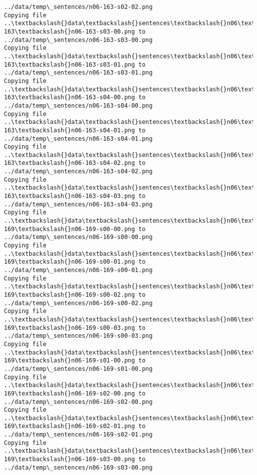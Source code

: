 \documentclass[11pt]{article}
\begin{document}
\begin{Verbatim}[commandchars=\\\{\}]
../data/temp\_sentences/n06-163-s02-02.png
Copying file ..\textbackslash{}data\textbackslash{}sentences\textbackslash{}n06\textbackslash{}n06-163\textbackslash{}n06-163-s03-00.png to
../data/temp\_sentences/n06-163-s03-00.png
Copying file ..\textbackslash{}data\textbackslash{}sentences\textbackslash{}n06\textbackslash{}n06-163\textbackslash{}n06-163-s03-01.png to
../data/temp\_sentences/n06-163-s03-01.png
Copying file ..\textbackslash{}data\textbackslash{}sentences\textbackslash{}n06\textbackslash{}n06-163\textbackslash{}n06-163-s04-00.png to
../data/temp\_sentences/n06-163-s04-00.png
Copying file ..\textbackslash{}data\textbackslash{}sentences\textbackslash{}n06\textbackslash{}n06-163\textbackslash{}n06-163-s04-01.png to
../data/temp\_sentences/n06-163-s04-01.png
Copying file ..\textbackslash{}data\textbackslash{}sentences\textbackslash{}n06\textbackslash{}n06-163\textbackslash{}n06-163-s04-02.png to
../data/temp\_sentences/n06-163-s04-02.png
Copying file ..\textbackslash{}data\textbackslash{}sentences\textbackslash{}n06\textbackslash{}n06-163\textbackslash{}n06-163-s04-03.png to
../data/temp\_sentences/n06-163-s04-03.png
Copying file ..\textbackslash{}data\textbackslash{}sentences\textbackslash{}n06\textbackslash{}n06-169\textbackslash{}n06-169-s00-00.png to
../data/temp\_sentences/n06-169-s00-00.png
Copying file ..\textbackslash{}data\textbackslash{}sentences\textbackslash{}n06\textbackslash{}n06-169\textbackslash{}n06-169-s00-01.png to
../data/temp\_sentences/n06-169-s00-01.png
Copying file ..\textbackslash{}data\textbackslash{}sentences\textbackslash{}n06\textbackslash{}n06-169\textbackslash{}n06-169-s00-02.png to
../data/temp\_sentences/n06-169-s00-02.png
Copying file ..\textbackslash{}data\textbackslash{}sentences\textbackslash{}n06\textbackslash{}n06-169\textbackslash{}n06-169-s00-03.png to
../data/temp\_sentences/n06-169-s00-03.png
Copying file ..\textbackslash{}data\textbackslash{}sentences\textbackslash{}n06\textbackslash{}n06-169\textbackslash{}n06-169-s01-00.png to
../data/temp\_sentences/n06-169-s01-00.png
Copying file ..\textbackslash{}data\textbackslash{}sentences\textbackslash{}n06\textbackslash{}n06-169\textbackslash{}n06-169-s02-00.png to
../data/temp\_sentences/n06-169-s02-00.png
Copying file ..\textbackslash{}data\textbackslash{}sentences\textbackslash{}n06\textbackslash{}n06-169\textbackslash{}n06-169-s02-01.png to
../data/temp\_sentences/n06-169-s02-01.png
Copying file ..\textbackslash{}data\textbackslash{}sentences\textbackslash{}n06\textbackslash{}n06-169\textbackslash{}n06-169-s03-00.png to
../data/temp\_sentences/n06-169-s03-00.png

\end{Verbatim}
\end{document}

